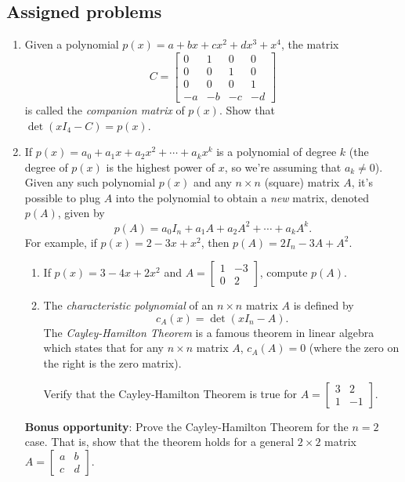 \documentclass[letterpaper,12pt]{article}
\begin{document}
\subsection*{Assigned problems}
\begin{enumerate}

\item Given a polynomial $p(x)=a+bx+cx^2+dx^3+x^4$, the matrix
\[
 C = \begin{bmatrix}
      0&1&0&0\\
0&0&1&0\\
0&0&0&1\\
-a&-b&-c&-d
     \end{bmatrix}
\]
is called the {\em companion matrix} of $p(x)$. Show that $\det(xI_4-C)=p(x)$.
\newpage
\item If $p(x)=a_0+a_1x+a_2x^2+\cdots + a_kx^k$ is a polynomial of degree $k$ (the degree of $p(x)$ is the highest power of $x$, so we're assuming that $a_k\neq 0$). Given any such polynomial $p(x)$ and any $n\times n$ (square) matrix $A$, it's possible to plug $A$ into the polynomial to obtain a {\em new} matrix, denoted $p(A)$, given by
\[
 p(A)=a_0I_n+a_1A+a_2A^2+\cdots + a_kA^k.
\]
For example, if $p(x)=2-3x+x^2$, then $p(A) = 2I_n-3A+A^2$.
\begin{enumerate}
 \item If $p(x) = 3-4x+2x^2$ and $A=\begin{bmatrix}1&-3\\0&2\end{bmatrix}$, compute $p(A)$.
 \item The {\em characteristic polynomial} of an $n\times n$ matrix $A$ is defined by
\[
 c_A(x) = \det(xI_n-A).
\]
 The {\em Cayley-Hamilton Theorem} is a famous theorem in linear algebra which states that for any $n\times n$ matrix $A$, $c_A(A) = 0$ (where the zero on the right is the zero matrix).

Verify that the Cayley-Hamilton Theorem is true for $A=\begin{bmatrix}3&2\\1&-1\end{bmatrix}$.
\end{enumerate}
{\bf Bonus opportunity}: Prove the Cayley-Hamilton Theorem for the $n=2$ case. That is, show that the theorem holds for a general $2\times 2$ matrix $A=\begin{bmatrix}a&b\\c&d\end{bmatrix}$.


\end{enumerate}
\end{document}
